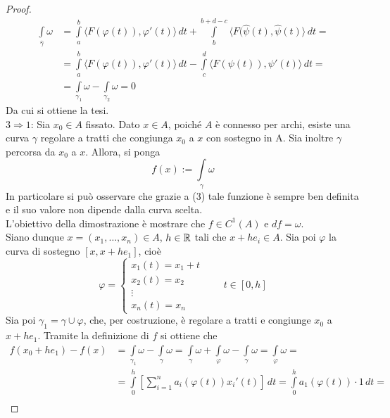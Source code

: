 \begin{proof}
\begin{equation}
\begin{aligned}
\int\limits_{\hat{{\gamma}}}{\omega} &= \int\limits_{a}^{b} \langle F(\varphi(t)), \varphi'(t)\rangle \, dt + \int\limits_{b}^{b+d-c}{\langle F(\hat{\psi}(t), \hat{\psi}(t) \rangle}\, dt=\\ 
&= \int\limits_{a}^{b} \langle F(\varphi(t)), \varphi'(t)\rangle \, dt - \int\limits_{c}^{d}{\langle F(\psi(t)), \psi'(t) \rangle}\, dt =\\
&= \int\limits_{\gamma_1}{\omega} - \int\limits_{\gamma_2}{\omega} = 0
\end{aligned}
\end{equation}
Da cui si ottiene la tesi.\\
$3 \Rightarrow 1$: Sia $x_0 \in A$ fissato. Dato $x \in A$, poiché $A$ è connesso per archi, esiste una curva $\gamma$ regolare a tratti che congiunga $x_0$ a $x$ con sostegno in A. Sia inoltre $\gamma$ percorsa da $x_0$ a $x$. Allora, si ponga
\begin{equation}
    f(x):=\int\limits_{\gamma}{\omega}
\end{equation}
In particolare si può osservare che grazie a (3) tale funzione è sempre ben definita e il suo valore non dipende dalla curva scelta.\\
L'obiettivo della dimostrazione è mostrare che $f \in C^1(A)$ e $df= \omega$.\\
Siano dunque $x=(x_1, \dots, x_n) \in A$, $h \in \mathbb{R}$ tali che $x+he_i \in A$. Sia poi $\varphi$ la curva di sostegno $[x, x+he_1]$, cioè
\begin{equation}
    \varphi= \begin{cases}
        x_1(t)=x_1+t\\
        x_2(t)=x_2\\
        \vdots\\
        x_n(t)=x_n
    \end{cases}
    \qquad t \in [0,h]
\end{equation}
Sia poi $\gamma_1= \gamma \cup \varphi$, che, per costruzione, è regolare a tratti e congiunge $x_0$ a $x+he_1$. Tramite la definizione di $f$ si ottiene che
\begin{equation}
\begin{aligned}
    f(x_0+he_1)-f(x)&=\int\limits_{\gamma_1}{\omega}- \int\limits_{\gamma}{\omega}= \int\limits_{\gamma}{\omega}+\int\limits_{\varphi}{\omega}-\int\limits_{\gamma}{\omega}= \int\limits_{\varphi}{\omega}=\\
    &=\int\limits_{0}^{h}{\left[\sum\limits_{i=1}^{n}{a_i(\varphi(t))x_i'(t)} \right]}\, dt=    \int\limits_{0}^{h}{a_1(\varphi(t))\cdot 1}\, dt =\\ 

\end{aligned}
\end{equation}
\end{proof}
